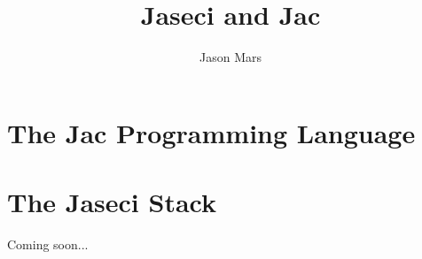 \documentclass[oneside]{book}
\title{Jaseci and Jac}
\author{Jason Mars}
\begin{document}

\cleardoublepage %
\setcounter{secnumdepth}{3} %
\setcounter{tocdepth}{3}
\tableofcontents
\pagebreak
\mtcaddchapter

\part{The Jac Programming Language}







\part{The Jaseci Stack}
Coming soon...

\appendix


% 

% 



\end{document}
